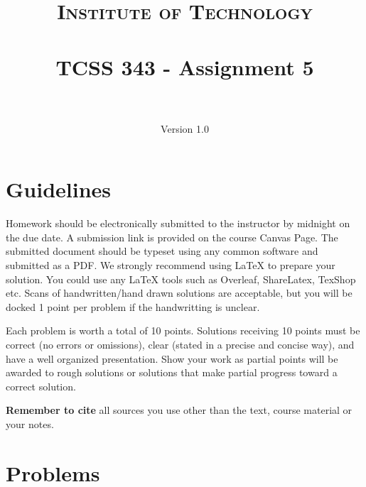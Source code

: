 \documentclass[paper=a4, fontsize=11pt]{scrartcl}
\title{
		\usefont{OT1}{bch}{b}{n}
		\normalfont \normalsize \textsc{Institute of Technology} \\ [25pt]
		\horrule{0.5pt} \\[0.4cm]
		\huge TCSS 343 - Assignment 5\\
		\horrule{2pt} \\[0.5cm]
}
\author{
		\normalfont 								\normalsize
        Version 1.0 \\
}
\numberwithin{equation}{section}		%
\numberwithin{figure}{section}			%
\numberwithin{table}{section}				%
\begin{document}
\maketitle

\section{Guidelines}
Homework should be electronically submitted to the instructor by midnight on the due date.  A submission link is provided on the course Canvas Page.  The submitted document should be typeset using any common software and submitted as a PDF.  We strongly recommend using \LaTeX\;  to prepare your solution.  You could use any \LaTeX\; tools such as Overleaf, ShareLatex, TexShop etc. Scans of handwritten/hand drawn solutions are acceptable, but you will be docked 1 point per problem if the handwritting is unclear.

Each problem is worth a total of 10 points.  Solutions receiving 10 points must be correct (no errors or omissions), clear (stated in a precise and concise way), and have a well organized presentation.  Show your work as partial points will be awarded to rough solutions or solutions that make partial progress toward a correct solution.

\textbf{Remember to cite} all sources you use other than the text, course material or your notes.

\newpage
\section{Problems}
\end{document}
